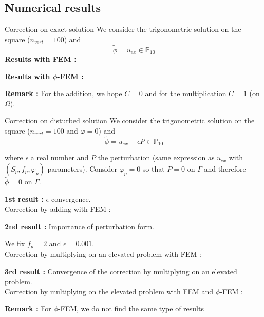 \documentclass[compress,10pt,xcolor={table,dvipsnames},t]{beamer}
\begin{document}
	\subsection{Numerical results}
	
	\begin{frame}{Correction on exact solution}
		We consider the trigonometric solution on the square ($n_{vert}=100$) and
		$$\tilde{\phi}=u_{ex}\in\mathbb{P}_{10}$$
		\textbf{Results with FEM :}
		\begin{center}
		\end{center}
		\textbf{Results with $\phi$-FEM :}
		\begin{center}
		\end{center}
		\textbf{Remark :} For the addition, we hope $C=0$ and for the multiplication $C=1$ (on $\Omega$).
	\end{frame}

	\begin{frame}[allowframebreaks]{Correction on disturbed solution}
		We consider the trigonometric solution on the square ($n_{vert}=100$ and $\varphi=0$) and
		$$\tilde{\phi}=u_{ex}+\epsilon P\in\mathbb{P}_{10}$$
		
		where $\epsilon$ a real number and $P$ the perturbation (same expression as $u_{ex}$ with $(S_p,f_p,\varphi_p)$ parameters). Consider $\varphi_p=0$ so that $P=0$ on $\Gamma$ and therefore $\tilde{\phi}=0$ on $\Gamma$.
		
		\textbf{1st result :} $\epsilon$ convergence. \\
		Correction by adding with FEM :
		\begin{center}
		\end{center}
	
		\textbf{2nd result :} Importance of perturbation form.
		
		We fix $f_p=2$ and $\epsilon=0.001$. \\
		Correction by multiplying on an elevated problem with FEM :
		\begin{minipage}{0.58\linewidth}
			\centering
		\end{minipage} \;
		\begin{minipage}{0.38\linewidth}
			\centering
		\end{minipage}
	
		\newpage
	
		\textbf{3rd result :} Convergence of the correction by multiplying on an elevated problem. \\
		Correction by multiplying on the elevated problem with FEM and $\phi$-FEM :
		\begin{center}
		\end{center}
	
		\textbf{Remark :} For $\phi$-FEM, we do not find the same type of results
	\end{frame}
\end{document}
